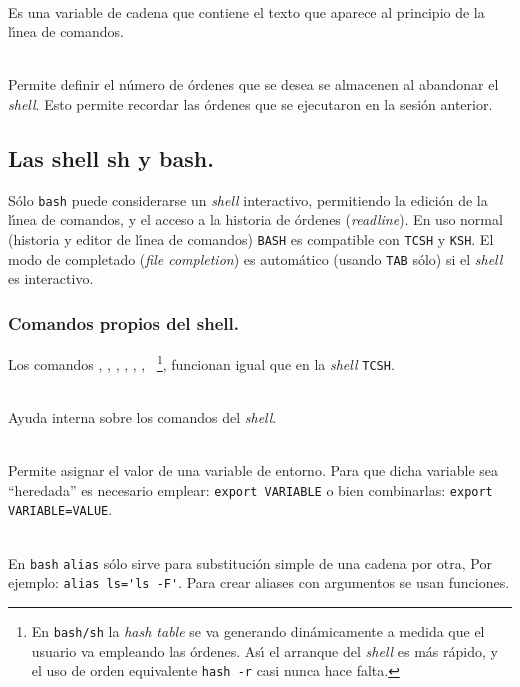 \noindent
{}\\[1mm]
Es una variable de cadena que contiene el texto que aparece al
principio de la l{\'\i}nea de comandos.

\noindent
{}\\
Permite definir el n{\'u}mero de {\'o}rdenes que se desea se almacenen al
abandonar el {\it shell}. Esto permite recordar las {\'o}rdenes que se
ejecutaron en la sesi{\'o}n anterior.


\subsection{Las shell sh y bash.}

S{\'o}lo \verb+bash+ puede considerarse un {\it shell} interactivo,
permitiendo la edici{\'o}n de la l{\'\i}nea de comandos, y el acceso a la
historia de {\'o}rdenes ({\it readline}). En uso normal (historia y editor
de l{\'\i}nea de comandos) \verb+BASH+ es compatible con \verb+TCSH+ y
\verb+KSH+.  El modo de completado ({\it file completion}) es
autom{\'a}tico (usando \verb+TAB+ s{\'o}lo) si el {\it shell} es interactivo.

\subsubsection{Comandos propios del shell.}

Los comandos , , , 
, , ,
\ \footnote{En {\tt bash/sh} la {\it hash table} se va
  generando din{\'a}micamente a medida que el usuario va empleando las
  {\'o}rdenes. As{\'\i} el arranque del {\it shell} es m{\'a}s r{\'a}pido, y el uso de orden  
  equivalente {\tt hash -r} casi nunca hace falta.},  funcionan igual
que en la {\it shell} \verb+TCSH+.

\vspace{.3cm}
\noindent
{}\\[1mm]
Ayuda interna sobre los comandos del {\it shell}.

\vspace{.3cm}
\noindent
{}\\[1mm]
Permite asignar el valor de una variable de entorno.  Para que dicha
variable sea ``heredada'' es necesario emplear: \verb+export VARIABLE+ o
bien combinarlas: \verb+export VARIABLE=VALUE+.

\vspace{.3cm}
\noindent
{}\\[1mm]
En \verb+bash+ \verb+alias+ s{\'o}lo sirve para substituci{\'o}n simple de una
cadena por otra, Por ejemplo: \verb+alias ls='ls -F'+.  Para crear
aliases con argumentos se usan funciones. 

